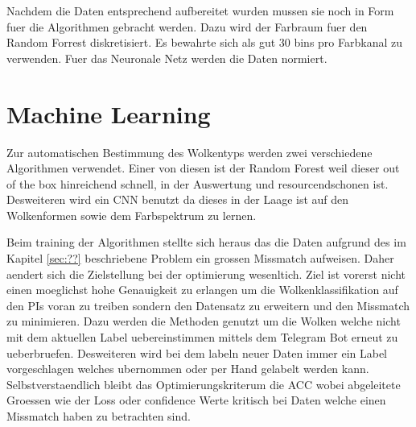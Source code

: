 Nachdem die Daten entsprechend aufbereitet wurden mussen sie noch in Form fuer
die Algorithmen gebracht werden. 
Dazu wird der Farbraum fuer den Random Forrest diskretisiert.
Es bewahrte sich als gut 30 bins pro Farbkanal zu verwenden.
Fuer das Neuronale Netz werden die Daten normiert.

\section{Machine Learning}

Zur automatischen Bestimmung des Wolkentyps werden zwei verschiedene Algorithmen
verwendet. 
Einer von diesen ist der Random Forest weil dieser out of the box hinreichend schnell,
in der Auswertung und resourcendschonen ist.
Desweiteren wird ein CNN benutzt da dieses in der Laage ist auf den Wolkenformen
sowie dem Farbspektrum zu lernen. 

Beim training der Algorithmen stellte sich heraus das die Daten aufgrund des im
Kapitel \ref{sec:??} beschriebene Problem ein grossen Missmatch aufweisen. 
Daher aendert sich die Zielstellung bei der optimierung wesenltich.
Ziel ist vorerst nicht einen moeglichst hohe Genauigkeit zu erlangen um die
Wolkenklassifikation auf den PIs voran zu treiben sondern den Datensatz zu
erweitern und den Missmatch zu minimieren.
Dazu werden die Methoden genutzt um die Wolken welche nicht mit dem aktuellen
Label uebereinstimmen mittels dem Telegram Bot erneut zu ueberbruefen.
Desweiteren wird bei dem labeln neuer Daten immer ein Label vorgeschlagen
welches ubernommen oder per Hand gelabelt werden kann.
Selbstverstaendlich bleibt das Optimierungskriterum die ACC wobei abgeleitete
Groessen wie der Loss oder confidence Werte kritisch bei Daten welche einen
Missmatch haben zu betrachten sind.

